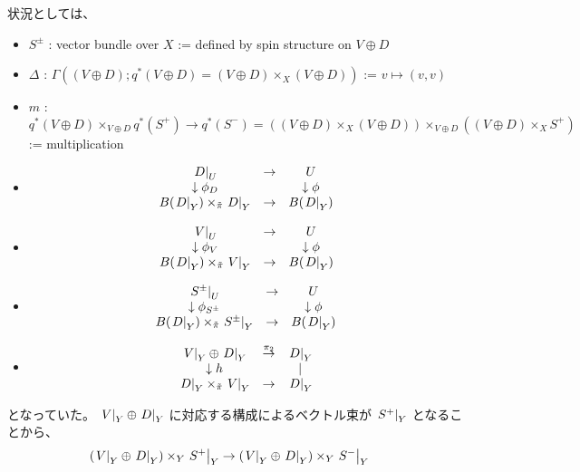 \begin{Proof}
\itemprof
  状況としては、
  \begin{itemize}
    \item \(S^{\pm}\) : vector bundle over \(X\) := defined by spin structure on \(V \oplus D\)
    \item \(\Delta\) : \(\Gamma((V \oplus D);q^*(V \oplus D) = (V \oplus D) \times_{X} (V \oplus D))\) := \(v \mapsto (v, v)\)
    \item \(m\) : \(q^*(V \oplus D) \times_{V \oplus D} q^*(S^{+}) \to q^*(S^{-}) = ((V \oplus D) \times_{X} (V \oplus D)) \times_{V \oplus D} ((V \oplus D) \times_{X} S^{+})\) := multiplication
    \item 
    \[\begin{matrix}
      \left. {D} \right| _{U} &\to& U \\
      \downarrow \phi_{D} & & \downarrow \phi \\
      B(\left. {D} \right| _{Y}) \times_{\tilde{\pi}} \left. {D} \right| _{Y} &\to& B(\left. {D} \right| _{Y})
    \end{matrix}\]
    \item 
    \[\begin{matrix}
      \left. {V} \right| _{U} &\to& U \\
      \downarrow \phi_{V} & & \downarrow \phi \\
      B(\left. {D} \right| _{Y}) \times_{\tilde{\pi}} \left. {V} \right| _{Y} &\to& B(\left. {D} \right| _{Y})
    \end{matrix}\]
    \item 
    \[\begin{matrix}
      \left. {S^{\pm}} \right| _{U} &\to& U \\
      \downarrow \phi_{S^{\pm}} & & \downarrow \phi \\
      B(\left. {D} \right| _{Y}) \times_{\tilde{\pi}} \left. {S^{\pm}} \right| _{Y} &\to& B(\left. {D} \right| _{Y})
    \end{matrix}\]
    \item 
    \[\begin{matrix}
      \left. {V} \right| _{Y} \oplus \left. {D} \right| _{Y} &\overset{\pi_2}{\to}& \left. {D} \right| _{Y} \\
      \downarrow h & & | \\
      \left. {D} \right| _{Y} \times_{\tilde{\pi}} \left. {V} \right| _{Y} &\to& \left. {D} \right| _{Y}
    \end{matrix}\]
  \end{itemize}
  となっていた。
  \(\left. {V} \right| _{Y} \oplus \left. {D} \right| _{Y}\) に対応する構成によるベクトル束が \(\left. {S^{+}} \right| _{Y}\) となることから、
  \begin{align*}
    (\restr{V}{Y} \oplus \restr{D}{Y}) \times_{Y} \restr{S^{+}}{Y} &\to (\restr{V}{Y} \oplus \restr{D}{Y}) \times_{Y} \restr{S^{-}}{Y} 

\end{align*}
\end{Proof}
